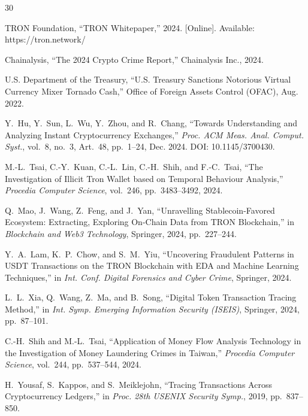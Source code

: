\documentclass[journal]{IEEEtran}
\begin{document}
    \begin{thebibliography}{30}
    
    TRON Foundation, ``TRON Whitepaper,'' 2024. [Online]. Available: https://tron.network/
    
    Chainalysis, ``The 2024 Crypto Crime Report,'' Chainalysis Inc., 2024.
    
    U.S. Department of the Treasury, ``U.S. Treasury Sanctions Notorious Virtual Currency Mixer Tornado Cash,'' Office of Foreign Assets Control (OFAC), Aug. 2022.
    
    Y.~Hu, Y.~Sun, L.~Wu, Y.~Zhou, and R.~Chang, ``Towards Understanding and Analyzing Instant Cryptocurrency Exchanges,'' \textit{Proc. ACM Meas. Anal. Comput. Syst.}, vol.~8, no.~3, Art.~48, pp.~1--24, Dec. 2024. DOI: 10.1145/3700430.
    
    M.-L.~Tsai, C.-Y.~Kuan, C.-L.~Lin, C.-H.~Shih, and F.-C.~Tsai, ``The Investigation of Illicit Tron Wallet based on Temporal Behaviour Analysis,'' \textit{Procedia Computer Science}, vol.~246, pp.~3483--3492, 2024.
    
    Q.~Mao, J.~Wang, Z.~Feng, and J.~Yan, ``Unravelling Stablecoin-Favored Ecosystem: Extracting, Exploring On-Chain Data from TRON Blockchain,'' in \textit{Blockchain and Web3 Technology}, Springer, 2024, pp.~227--244.
    
    Y.~A.~Lam, K.~P.~Chow, and S.~M.~Yiu, ``Uncovering Fraudulent Patterns in USDT Transactions on the TRON Blockchain with EDA and Machine Learning Techniques,'' in \textit{Int. Conf. Digital Forensics and Cyber Crime}, Springer, 2024.
    
    L.~L.~Xia, Q.~Wang, Z.~Ma, and B.~Song, ``Digital Token Transaction Tracing Method,'' in \textit{Int. Symp. Emerging Information Security (ISEIS)}, Springer, 2024, pp.~87--101.
    
    C.-H.~Shih and M.-L.~Tsai, ``Application of Money Flow Analysis Technology in the Investigation of Money Laundering Crimes in Taiwan,'' \textit{Procedia Computer Science}, vol.~244, pp.~537--544, 2024.
    
    H.~Yousaf, S.~Kappos, and S.~Meiklejohn, ``Tracing Transactions Across Cryptocurrency Ledgers,'' in \textit{Proc. 28th USENIX Security Symp.}, 2019, pp.~837--850.
    

\end{thebibliography}
\end{document}
